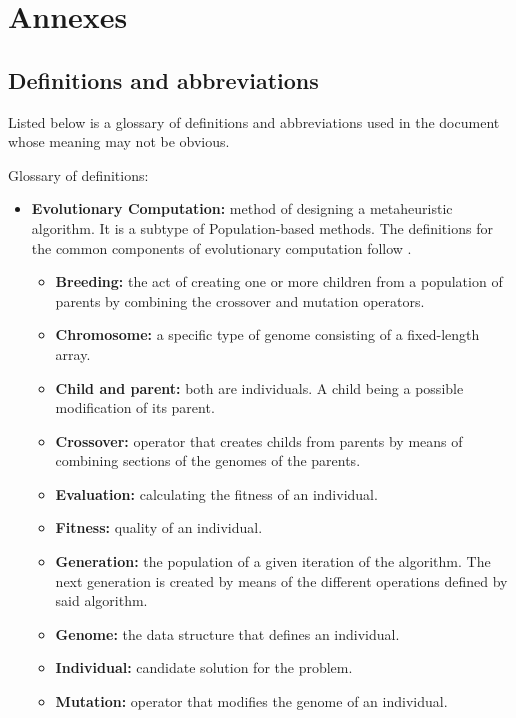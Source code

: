 \renewcommand{\documentname}{Annexes}

\chapter{Annexes}


\section{Definitions and abbreviations}\label{defs-abbrev}

Listed below is a glossary of definitions and abbreviations used in the document whose meaning may not be obvious.

Glossary of definitions:

\begin{itemize}
    \item \textbf{Evolutionary Computation:} method of designing a metaheuristic algorithm. It is a subtype of Population-based methods. The definitions for the common components of evolutionary computation follow \cite{luke13metaheuristics}.
        \begin{itemize}
            \item \textbf{Breeding:} the act of creating one or more children from a population of parents by combining the crossover and mutation operators.
            \item \textbf{Chromosome:} a specific type of genome consisting of a fixed-length array.
            \item \textbf{Child and parent:} both are individuals. A child being a possible modification of its parent.
            \item \textbf{Crossover:} operator that creates childs from parents by means of combining sections of the genomes of the parents.
            \item \textbf{Evaluation:} calculating the fitness of an individual.
            \item \textbf{Fitness:} quality of an individual.
            \item \textbf{Generation:} the population of a given iteration of the algorithm. The next generation is created by means of the different operations defined by said algorithm.
            \item \textbf{Genome:} the data structure that defines an individual.
            \item \textbf{Individual:} candidate solution for the problem.
            \item \textbf{Mutation:} operator that modifies the genome of an individual.

\end{itemize}
\end{itemize}
